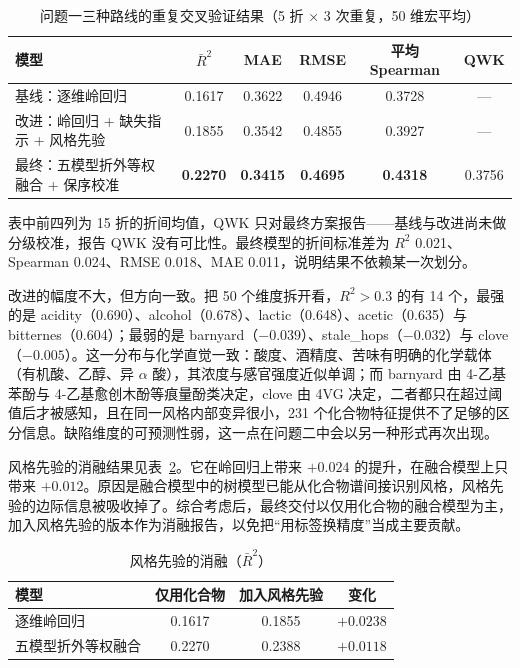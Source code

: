 ﻿\documentclass[UTF8,a4paper,zihao=-4]{ctexart}
\numberwithin{figure}{section}
\numberwithin{table}{section}
\numberwithin{equation}{section}
\begin{document}
\begin{table}[H]
  \centering
  \caption{问题一三种路线的重复交叉验证结果（5 折 × 3 次重复，50 维宏平均）}
  \label{tab:q1-results}
  \small
  \begin{tabularx}{\textwidth}{@{}X c c c c c@{}}
    \toprule
    模型 & $\bar R^2$ & MAE & RMSE & 平均 Spearman & QWK \\
    \midrule
    基线：逐维岭回归 & 0.1617 & 0.3622 & 0.4946 & 0.3728 & — \\
    改进：岭回归 + 缺失指示 + 风格先验 & 0.1855 & 0.3542 & 0.4855 & 0.3927 & — \\
    最终：五模型折外等权融合 + 保序校准 & \textbf{0.2270} & \textbf{0.3415} & \textbf{0.4695} & \textbf{0.4318} & 0.3756 \\
    \bottomrule
  \end{tabularx}
\end{table}

表中前四列为 15 折的折间均值，QWK 只对最终方案报告——基线与改进尚未做分级校准，报告 QWK 没有可比性。最终模型的折间标准差为 $R^2$ 0.021、Spearman 0.024、RMSE 0.018、MAE 0.011，说明结果不依赖某一次划分。

改进的幅度不大，但方向一致。把 50 个维度拆开看，$R^2>0.3$ 的有 14 个，最强的是 acidity（0.690）、alcohol（0.678）、lactic（0.648）、acetic（0.635）与 bitternes（0.604）；最弱的是 barnyard（$-0.039$）、stale\_hops（$-0.032$）与 clove（$-0.005$）。这一分布与化学直觉一致：酸度、酒精度、苦味有明确的化学载体（有机酸、乙醇、异 $\alpha$ 酸），其浓度与感官强度近似单调；而 barnyard 由 4-乙基苯酚与 4-乙基愈创木酚等痕量酚类决定，clove 由 4VG 决定，二者都只在超过阈值后才被感知，且在同一风格内部变异很小，231 个化合物特征提供不了足够的区分信息。缺陷维度的可预测性弱，这一点在问题二中会以另一种形式再次出现。

风格先验的消融结果见表~\ref{tab:q1-abc}。它在岭回归上带来 $+0.024$ 的提升，在融合模型上只带来 $+0.012$。原因是融合模型中的树模型已能从化合物谱间接识别风格，风格先验的边际信息被吸收掉了。综合考虑后，最终交付以仅用化合物的融合模型为主，加入风格先验的版本作为消融报告，以免把“用标签换精度”当成主要贡献。

\begin{table}[H]
  \centering
  \caption{风格先验的消融（$\bar R^2$）}
  \label{tab:q1-abc}
  \small
  \begin{tabularx}{\textwidth}{@{}X c c c@{}}
    \toprule
    模型 & 仅用化合物 & 加入风格先验 & 变化 \\
    \midrule
    逐维岭回归 & 0.1617 & 0.1855 & $+0.0238$ \\
    五模型折外等权融合 & 0.2270 & 0.2388 & $+0.0118$ \\
    \bottomrule
  \end{tabularx}
\end{table}
\end{document}
